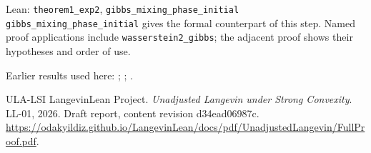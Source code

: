 \documentclass[11pt,a4paper]{article}
\begin{document}
\begin{leanbox}{Lean: \texttt{theorem1\_\allowbreak{}exp2}, \texttt{gibbs\_\allowbreak{}mixing\_\allowbreak{}phase\_\allowbreak{}initial}}
\texttt{gibbs\_\allowbreak{}mixing\_\allowbreak{}phase\_\allowbreak{}initial} gives the formal counterpart of this step. Named proof applications include \texttt{wasserstein2\_\allowbreak{}gibbs}; the adjacent proof shows their hypotheses and order of use.
\end{leanbox}


Earlier results used here: \cite[Section~3.17.4]{LangevinLean2026ULASC}; \cite[Section~3.26.13]{LangevinLean2026ULASC}; \cite[Section~3.26.3]{LangevinLean2026ULASC}.

\begin{thebibliography}{ULA-LSI}
LangevinLean Project. \emph{Unadjusted Langevin under Strong Convexity}. LL-01, 2026. Draft report, content revision d34ead06987c. \url{https://odakyildiz.github.io/LangevinLean/docs/pdf/UnadjustedLangevin/FullProof.pdf}.
\end{thebibliography}
\end{document}
